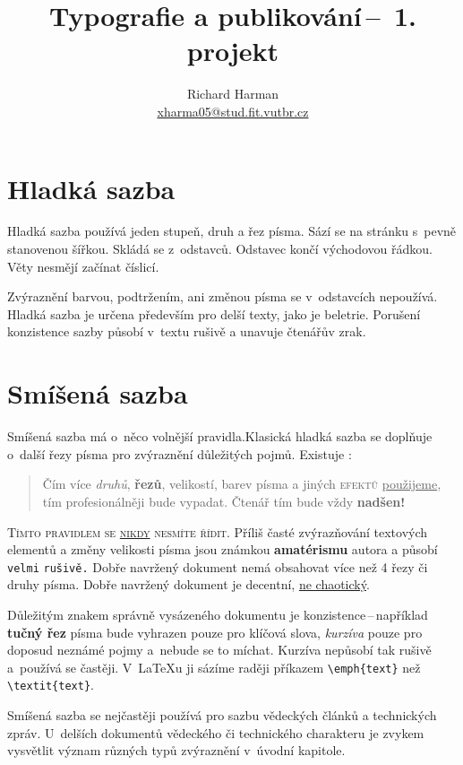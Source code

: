 \documentclass[a4paper, 10pt, twocolumn]{article}
\title{Typografie a publikování\,--\, 1. projekt}
\author{Richard Harman\\ \url{xharma05@stud.fit.vutbr.cz}}
\date{}
\begin{document}
\maketitle
\section{Hladká sazba}\label{sec:hladka}
Hladká sazba používá jeden stupeň, druh a řez písma.
Sází se na stránku s~pevně stanovenou šířkou.
Skládá se z~odstavců. Odstavec končí východovou řádkou.
Věty nesmějí začínat číslicí.

Zvýraznění barvou, podtržením, ani změnou písma se v~odstavcích nepoužívá.
Hladká sazba je určena především pro delší texty, jako je beletrie.
Porušení konzistence sazby působí v~textu rušivě a unavuje čtenářův zrak.
\section{Smíšená sazba}\label{sec:smisena}
Smíšená sazba má o~něco volnější pravidla.Klasická hladká sazba se doplňuje o~další řezy písma pro zvýraznění důležitých pojmů. Existuje :

\begin{quotation}
Čím více \emph{druhů}, \textbf{řezů}, {\LARGE velikostí}, {\color{blue} barev} písma a jiných {\color{red}\textsc{efektů}} \underline{použijeme}, tím {\color{orange}profesionálněji} bude {\selectfont {\Large dokument}} vypadat. {\tiny Čtenář} tím bude vždy \textbf{\Huge{nadšen!}}
\end{quotation}

\textsc{Tímto pravidlem se \underline{nikdy} nesmíte řídit.} 
Příliš časté zvýrazňování textových elementů a změny {\tiny velikosti} písma jsou známkou \textbf{amatérismu} autora a působí \verb|velmi| \verb|rušivě.|
Dobře navržený dokument nemá obsahovat více než 4 řezy či druhy písma.
Dobře navržený dokument je decentní, \underline{ne chaotický}.

Důležitým znakem správně vysázeného dokumentu je konzistence\,--\,například {\bf tučný řez}
písma bude vyhrazen pouze pro klíčová slova, \emph{kurzíva} pouze pro doposud neznámé
pojmy a~nebude se to míchat. Kurzíva nepůsobí tak rušivě a~používá se častěji. V~\LaTeX u
ji sázíme raději příkazem \verb|\emph{text}| než \verb|\textit{text}|.

Smíšená sazba se nejčastěji používá pro sazbu vědeckých článků a technických zpráv.
U~delších dokumentů vědeckého či technického charakteru je zvykem vysvětlit význam různých typů zvýraznění v~úvodní kapitole.
\end{document}
